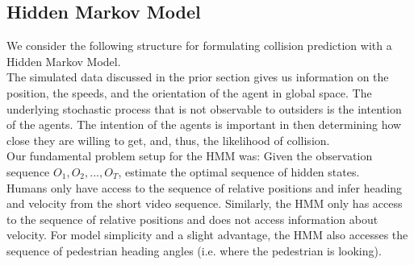 \subsection{Hidden Markov Model}
We consider the following structure for formulating collision prediction with a Hidden Markov Model. \\
The simulated data discussed in the prior section gives us information on the position, the speeds, and the orientation of the agent in global space. The underlying stochastic process that is not observable to outsiders is the intention of the agents. The intention of the agents is important in then determining how close they are willing to get, and, thus, the likelihood of collision. \\
Our fundamental problem setup for the HMM was: Given the observation sequence $O_1, O_2,...,O_T$, estimate the optimal sequence of hidden states. \\
Humans only have access to the sequence of relative positions and infer heading and velocity from the short video sequence. Similarly, the HMM only has access to the sequence of relative positions and does not access information about velocity. For model simplicity and a slight advantage, the HMM also accesses the sequence of pedestrian heading angles (i.e. where the pedestrian is looking).
